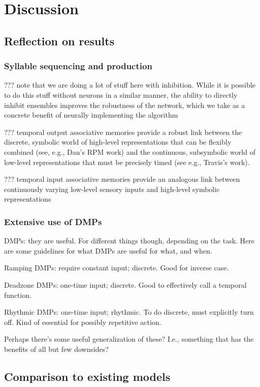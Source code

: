 \chapter{Discussion}

\section{Reflection on results}

\subsection{Syllable sequencing and production}

??? note that we are doing a lot of stuff
here with inhibition.
While it is possible to do this stuff
without neurons in a similar manner,
the ability to directly inhibit ensembles
improves the robustness of the network,
which we take as a concrete benefit
of neurally implementing the algorithm

??? temporal output associative memories
provide a robust link between the discrete,
symbolic world of high-level representations
that can be flexibly combined (see, e.g., Dan's RPM work)
and the continuous, subsymbolic world
of low-level representations that must
be precisely timed (see e.g., Travis's work).

??? temporal input associative memories
provide an analogous link between
continuously varying low-level sensory inputs
and high-level symbolic representations

\subsection{Extensive use of DMPs}

DMPs: they are useful.
For different things though, depending on the task.
Here are some guidelines for
what DMPs are useful for what, and when.

Ramping DMPs: require constant input; discrete.
Good for inverse case.

Deadzone DMPs: one-time input; discrete.
Good to effectively call a temporal function.

Rhythmic DMPs: one-time input; rhythmic.
To do discrete, must explicitly turn off.
Kind of essential for possibly repetitive action.

Perhaps there's some useful generalization of these?
I.e., something that has the benefits of all but
few downsides?

\section{Comparison to existing models}

